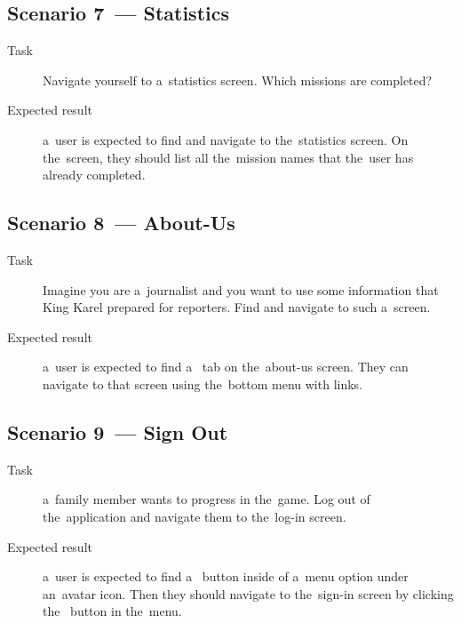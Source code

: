 \subsection*{Scenario 7~--- Statistics}

\begin{description}
    \item[Task] Navigate yourself to a~statistics screen.
    Which missions are completed?
    \item[Expected result] a~user is expected to
    find and navigate to the~statistics screen.
    On the~screen,
    they should list all the~mission names that the~user has already completed.
\end{description}

\subsection*{Scenario 8~--- About-Us}

\begin{description}
    \item[Task] Imagine you are a~journalist
    and you want to use some information
    that King Karel prepared for reporters.
    Find and navigate to such a~screen.
    \item[Expected result] a~user is expected to find a~ tab on the~about-us screen.
    They can navigate to that screen using the~bottom menu with links.
\end{description}

\subsection*{Scenario 9~--- Sign Out}

\begin{description}
    \item[Task] a~family member wants to progress in the~game.
    Log out of the~application
    and navigate them to the~log-in screen.
    \item[Expected result] a~user is expected to
    find a~ button inside of a~menu option under an~avatar icon.
    Then they should navigate to the~sign-in screen
    by clicking the~ button in the~menu.    
\end{description}
